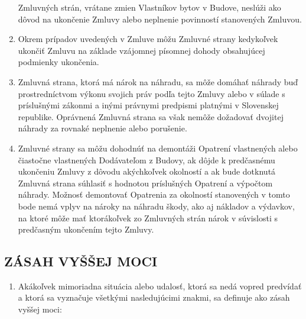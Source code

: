 \begin{multicols}{2}
\begin{enumerate}
  Zmluvných strán, vrátane zmien Vlastníkov bytov v Budove, neslúži ako
  dôvod na ukončenie Zmluvy alebo neplnenie povinností stanovených
  Zmluvou.
\item
  Okrem prípadov uvedených v Zmluve môžu Zmluvné strany kedykoľvek
  ukončiť Zmluvu na základe vzájomnej písomnej dohody obsahujúcej
  podmienky ukončenia.
\item
  Zmluvná strana, ktorá má nárok na náhradu, sa môže domáhať náhrady buď
  prostredníctvom výkonu svojich práv podľa tejto Zmluvy alebo v súlade
  s príslušnými zákonmi a inými právnymi predpismi platnými v Slovenskej
  republike. Oprávnená Zmluvná strana sa však nemôže dožadovať dvojitej
  náhrady za rovnaké neplnenie alebo porušenie.
\item
  Zmluvné strany sa môžu dohodnúť na demontáži Opatrení vlastnených
  alebo čiastočne vlastnených Dodávateľom z Budovy, ak dôjde k
  predčasnému ukončeniu Zmluvy z dôvodu akýchkoľvek okolností a ak bude
  dotknutá Zmluvná strana súhlasiť s hodnotou príslušných Opatrení a
  výpočtom náhrady. Možnosť demontovať Opatrenia za okolností
  stanovených v tomto bode nemá vplyv na nároky na náhradu škody, ako aj
  nákladov a výdavkov, na ktoré môže mať ktorákoľvek zo Zmluvných strán
  nárok v súvislosti s predčasným ukončením tejto Zmluvy.
\end{enumerate}

\subsection{ZÁSAH VYŠŠEJ MOCI}

\begin{enumerate}
\def\labelenumi{\arabic{enumi}.}
\item
  Akákoľvek mimoriadna situácia alebo udalosť, ktorá sa nedá vopred
  predvídať a ktorá sa vyznačuje všetkými nasledujúcimi znakmi, sa
  definuje ako zásah vyššej moci:


\end{enumerate}
\end{multicols}
